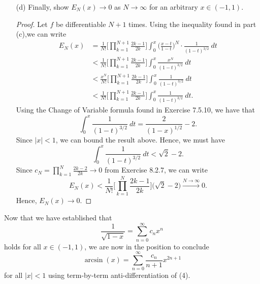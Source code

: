 \begin{enumerate}
\begin{proof}[Solution]
\begin{align*}
                                                     &\leq \sqrt{ (x - t )^{2} }  \\
                                                     &= |  x -t  | \\
                                                     &\leq |  x  |
        \end{align*}
        which holds for \(  t \in \Z  \).
        \end{proof}
    \item[(d)] Finally, show \( E_{N}(x) \to 0  \) as \( N \to \infty  \) for an arbitrary \( x \in (-1 , 1) \).
        \begin{proof}
        Let \( f  \) be differentiable \( N + 1  \) times. Using the inequality found in part (c),we can write 
        \begin{align*}
            E_{N}(x) &= \frac{ 1 }{ N! }  \Big[ \prod_{k=1}^{N+1}  \frac{ 2k - 1  }{ 2k  } \Big] \int_{ 0 }^{ x  }  \Big( \frac{ x -t  }{ 1 - t  }  \Big)^{N } \cdot \frac{ 1 }{ (1-t)^{3/2} } \  dt   \\
                     &< \frac{ 1 }{ N! } \Big[ \prod_{k=1}^{N+1} \frac{ 2k - 1  }{ 2k  } \Big]  \int_{ 0 }^{ x }  \frac{ x^{N} }{  (1-t)^{3/2} } \  dt \\
                     &< \frac{ x^{N} }{ N! }  \Big[ \prod_{k=1}^{N+1} \frac{ 2k - 1  }{ 2k  }\Big] \int_{ 0 }^{ x  }  \frac{ 1 }{ (1-t)^{3/2} } \  dt \\
                     &< \frac{ 1 }{ N! }  \Big[ \prod_{k=1}^{N+1} \frac{ 2k - 1  }{ 2k  }\Big] \int_{ 0 }^{ x }  \frac{ 1 }{ (1-t)^{3/2} } \  dt.
        \end{align*}
        Using the Change of Variable formula found in Exercise 7.5.10, we have that 
        \[  \int_{ 0 }^{ x }  \frac{ 1 }{ (1-t)^{3/2} } \  dt = \frac{ 2 }{ (1-x)^{1/2} } - 2.  \]
        Since \( | x  | < 1  \), we can bound the result above. Hence, we must have 
        \[  \int_{ 0 }^{ x }  \frac{ 1 }{ (1-t)^{3/2}  } \ dt < \sqrt{ 2 }  - 2.  \]
        Since \( c_{N} = \prod_{k=1}^{N} \frac{ 2k-2 }{ 2k } \to 0  \) from Exercise 8.2.7, we can write
        \[  E_{N}(x) < \frac{ 1 }{ N! } \Big[ \prod_{k=1}^{N} \frac{ 2k-1 }{ 2k }  \Big] \Big( \sqrt{ 2 }  - 2  \Big) \xrightarrow{N\rightarrow\infty} 0.  \]
        Hence, \( E_{N}(x) \to 0  \).
        \end{proof}
\end{enumerate}
Now that we have established that 
\[  \frac{ 1 }{ \sqrt{ 1 - x  }  }  = \sum_{ n=0 }^{ \infty  } c_{n} x^{n} \tag{4}  \] holds for all \( x \in (-1,1 ) \), we are now in the position to conclude 
\[  \arcsin(x) = \sum_{ n=0  }^{ \infty  } \frac{ c_{n} }{  n+1  } x^{2n+1}  \] for all \( |  x  |  < 1  \) using term-by-term anti-differentiation of (4).

